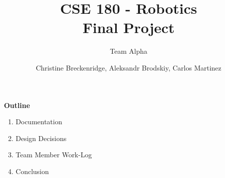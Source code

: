 \documentclass[12pt]{article}
\title{CSE 180 - Robotics \\ Final Project}
\subtitle{Team Alpha}
\author{Christine Breckenridge, Aleksandr Brodskiy, Carlos Martinez}
\begin{document}
\maketitle
{\setlength{\parindent}{0cm}
\textbf{Outline}
\begin{enumerate}  
\item Documentation
\item Design Decisions
\item Team Member Work-Log
    \item Conclusion\\\\\\\\\\\\\\\\\\\\\\\\\\\\\\\\\\
\end{enumerate} 
}
\end{document}
